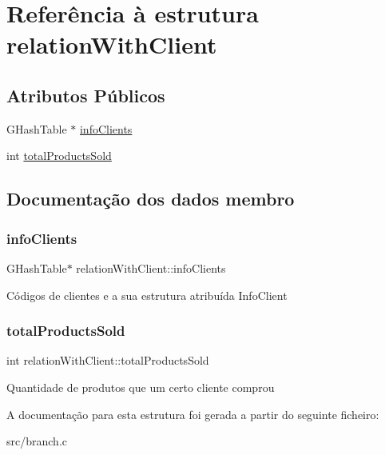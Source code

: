 \hypertarget{structrelationWithClient}{}\section{Referência à estrutura relation\+With\+Client}
\label{structrelationWithClient}
\subsection*{Atributos Públicos}
\begin{DoxyCompactItemize}
\item 
G\+Hash\+Table $\ast$ \hyperlink{structrelationWithClient_a22bd16a18137ef6367f2eecad189fef4}{info\+Clients}
\item 
int \hyperlink{structrelationWithClient_a8303ce1003a3a309089e272897e8f9d6}{total\+Products\+Sold}
\end{DoxyCompactItemize}


\subsection{Documentação dos dados membro}
\mbox{\label{structrelationWithClient_a22bd16a18137ef6367f2eecad189fef4}} 
\subsubsection{\texorpdfstring{info\+Clients}{infoClients}}
{\footnotesize\ttfamily G\+Hash\+Table$\ast$ relation\+With\+Client\+::info\+Clients}

Códigos de clientes e a sua estrutura atribuída Info\+Client \mbox{\label{structrelationWithClient_a8303ce1003a3a309089e272897e8f9d6}} 
\subsubsection{\texorpdfstring{total\+Products\+Sold}{totalProductsSold}}
{\footnotesize\ttfamily int relation\+With\+Client\+::total\+Products\+Sold}

Quantidade de produtos que um certo cliente comprou 

A documentação para esta estrutura foi gerada a partir do seguinte ficheiro\+:\begin{DoxyCompactItemize}
\item 
src/branch.\+c\end{DoxyCompactItemize}
